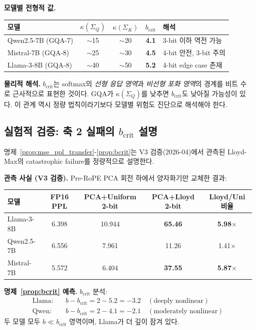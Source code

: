 \begin{theorycomment}
\textbf{모델별 전형적 값.}
\begin{center}
\begin{tabular}{lcccl}
\toprule
모델 & $\kappa(\Sigma_Q)$ & $\kappa(\Sigma_K)$ & $b_{\mathrm{crit}}$ & 해석 \\
\midrule
Qwen2.5-7B (GQA-7) & $\sim$15 & $\sim$20 & \textbf{4.1} & 3-bit 이하 역전 가능 \\
Mistral-7B (GQA-8) & $\sim$25 & $\sim$30 & \textbf{4.5} & 4-bit 안전, 3-bit 주의 \\
Llama-3-8B (GQA-8) & $\sim$40 & $\sim$50 & \textbf{5.2} & 4-bit edge case 존재 \\
\bottomrule
\end{tabular}
\end{center}
\textbf{물리적 해석.} $b_{\mathrm{crit}}$는 softmax의 \emph{선형 응답 영역}과 \emph{비선형 포화 영역}의 경계를 비트 수로 근사적으로 표현한 것이다. GQA가 $\kappa(\Sigma_Q)$를 낮추면 $b_{\mathrm{crit}}$도 낮아질 가능성이 있다. 이 관계 역시 정량 법칙이라기보다 모델별 위험도 진단으로 해석해야 한다.
\end{theorycomment}

\subsection{실험적 검증: 축 2 실패의 $b_{\mathrm{crit}}$ 설명}
\label{sec:axis2_verification}

명제~\ref{prop:mse_ppl_transfer}-\ref{prop:bcrit}는 V3 검증(2026-04)에서 관측된 Lloyd-Max의 catastrophic failure를 정량적으로 설명한다.

\textbf{관측 사실 (V3 검증).} Pre-RoPE PCA 회전 하에서 양자화기만 교체한 결과:
\begin{center}
\begin{tabular}{lcccc}
\toprule
모델 & FP16 PPL & PCA+Uniform 2-bit & PCA+Lloyd 2-bit & Lloyd/Uni 비율 \\
\midrule
Llama-3-8B  & 6.398 & 10.944 & \textbf{65.46} & \textbf{5.98}$\times$ \\
Qwen2.5-7B  & 6.556 & 7.961  & 11.26          & 1.41$\times$ \\
Mistral-7B  & 5.572 & 6.404  & \textbf{37.55} & \textbf{5.87}$\times$ \\
\bottomrule
\end{tabular}
\end{center}

\textbf{명제~\ref{prop:bcrit} 예측.} $b_{\mathrm{crit}}$ 분석:
\begin{align*}
\text{Llama:}\quad & b - b_{\mathrm{crit}} = 2 - 5.2 = -3.2 \quad (\text{deeply nonlinear}) \\
\text{Qwen:}\quad  & b - b_{\mathrm{crit}} = 2 - 4.1 = -2.1 \quad (\text{moderately nonlinear})
\end{align*}
두 모델 모두 $b \ll b_{\mathrm{crit}}$ 영역이며, Llama가 더 깊이 잠겨 있다.

